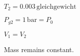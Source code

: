 \( T_2 = 0.003 \, \text{gleichgewicht} \)  

\( P_{g2} = 1 \, \text{bar} = P_0 \)  

\( V_1 = V_2 \)  

Mass remains constant.